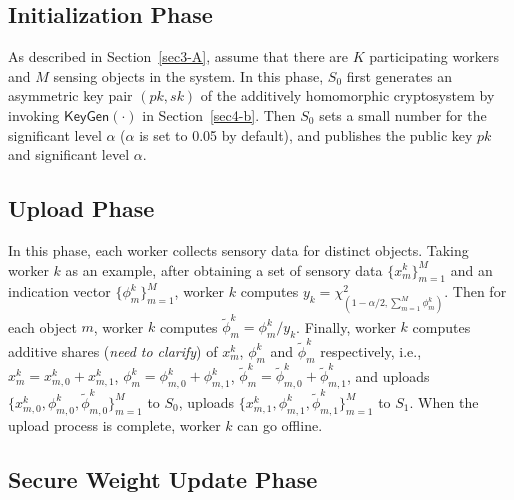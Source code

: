 \documentclass[conference]{IEEEtran}
\begin{document}
\subsection{Initialization Phase}

As described in Section~\ref{sec3-A}, assume that there are $K$ participating workers and $M$ sensing objects in the system.
In this phase, $S_0$ first generates an asymmetric key pair $(pk, sk)$ of the additively homomorphic cryptosystem by invoking $\mathsf{KeyGen}(\cdot)$ in Section~\ref{sec4-b}.
Then $S_0$ sets a small number for the significant level $\alpha$ ($\alpha$ is set to 0.05 by default), and publishes the public key $pk$ and significant level $\alpha$.


\subsection{Upload Phase}

In this phase, each worker collects sensory data for distinct objects.
Taking worker $k$ as an example, after obtaining a set of sensory data $\{x_m^k\}_{m=1}^M$ and an indication vector $\{\phi_m^k\}_{m=1}^M$, worker $k$ computes $y_k = \chi^2_{(1-\alpha/2, \sum_{m=1}^M \phi_m^k)}$.
Then for each object $m$, worker $k$ computes $\tilde{\phi}_m^k = \phi_m^k / y_k$.
Finally, worker $k$ computes additive shares ({\em need to clarify}) of $x_m^k$, $\phi_m^k$ and $\tilde{\phi}_m^k$ respectively, i.e., $x_m^k = x_{m,0}^k + x_{m,1}^k$, $\phi_m^k = \phi_{m,0}^k + \phi_{m,1}^k$, $\tilde{\phi}_m^k = \tilde{\phi}_{m,0}^k + \tilde{\phi}_{m,1}^k$, and uploads $\{x_{m,0}^k, \phi_{m,0}^k ,\tilde{\phi}_{m,0}^k\}_{m=1}^M$ to $S_0$, uploads $\{x_{m,1}^k, \phi_{m,1}^k, \tilde{\phi}_{m,1}^k\}_{m=1}^M$ to $S_1$.
When the upload process is complete, worker $k$ can go offline.

\subsection{Secure Weight Update Phase}
\end{document}
